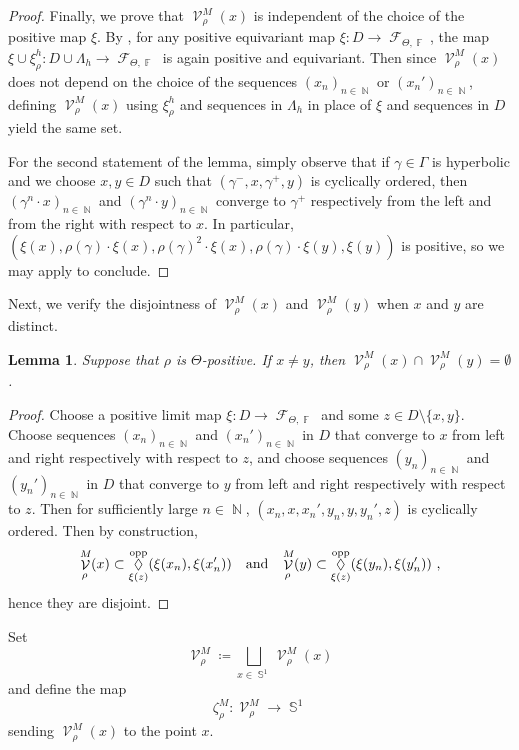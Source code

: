 \documentclass{amsart}
\theoremstyle{plain}
\newtheorem{lemma}[proposition]{Lemma}
\theoremstyle{definition}
\DeclareMathOperator{\Diam}{\lozenge}
\newcommand{\bdext}{{\Vc^M_\rho}}
\DeclareMathOperator{\Fc}{\mathcal{F}}
\DeclareMathOperator{\Vc}{\mathcal{V}}
\DeclareMathOperator{\Fb}{{\mathbb{F}}}
\DeclareMathOperator{\Nb}{{\mathbb{N}}}
\DeclareMathOperator{\Sb}{\mathbb{S}}
\newcommand{\opp}{\textnormal{opp}}
\newcommand{\1}{\mathbf{1}}
\begin{document}
\begin{proof}
Finally, we prove that $\bdext(x)$ is independent of the choice of the positive map $\xi$. By , for any positive equivariant map $\xi: D\to \Fc_{\Theta,\Fb}$, the map $\xi \cup \xi^h_\rho\colon D\cup \Lambda_h \to \Fc_{\Theta, \Fb}$ is again positive and equivariant. Then since $\bdext(x)$ does not depend on the choice of the sequences $(x_n)_{n\in\Nb}$ or $(x_n')_{n\in\Nb}$, defining $\bdext(x)$ using $\xi^h_\rho$ and sequences in $\Lambda_h$ in place of $\xi$ and sequences in $D$ yield the same set. 

For the second statement of the lemma, simply observe that if $\gamma\in\Gamma$ is hyperbolic and we choose $x,y\in D$ such that $(\gamma^-,x,\gamma^+,y)$ is cyclically ordered, then $(\gamma^n\cdot x)_{n\in\Nb}$ and $(\gamma^n\cdot y)_{n\in\Nb}$ converge to $\gamma^+$ respectively from the left and from the right with respect to $x$. In particular, $(\xi(x),\rho(\gamma)\cdot \xi(x), \rho(\gamma)^2\cdot \xi(x), \rho(\gamma)\cdot \xi(y), \xi(y))$ is positive, so we may apply  to conclude.
\end{proof}


Next, we verify the disjointness of $\bdext(x)$ and $\bdext(y)$ when $x$ and $y$ are distinct.

\begin{lemma}
Suppose that $\rho$ is $\Theta$-positive. If $x\neq y$, then $\bdext (x) \cap \bdext (y) = \emptyset$.
\end{lemma}

\begin{proof}
Choose a positive limit map $\xi \colon D \to \Fc_{\Theta,\Fb}$ and some $z\in D\setminus\{x,y\}$. Choose sequences $(x_n)_{n\in\Nb}$ and $(x_n')_{n\in\Nb}$ in $D$ that converge to $x$ from left and right respectively with respect to $z$, and choose sequences $(y_n)_{n\in\Nb}$ and $(y_n')_{n\in\Nb}$ in $D$ that converge to $y$ from left and right respectively with respect to $z$. Then for sufficiently large $n\in\Nb$, $(x_n,x,x_n',y_n,y,y_n',z)$ is cyclically ordered. Then by construction,
\[\bdext(x)\subset \Diam^\opp_{\xi(z)}(\xi(x_n),\xi(x_n'))\quad \text{and}\quad \bdext(y)\subset \Diam^\opp_{\xi(z)}(\xi(y_n),\xi(y_n'))~,\] hence they are disjoint.
\end{proof}

Set
    \[\bdext  \coloneqq  \bigsqcup_{x\in \Sb^1} \bdext (x)\]
and define the map
\[ \zeta^M_\rho\colon \bdext  \to \Sb^1\]
sending $\bdext (x)$ to the point $x$. 
\end{document}
